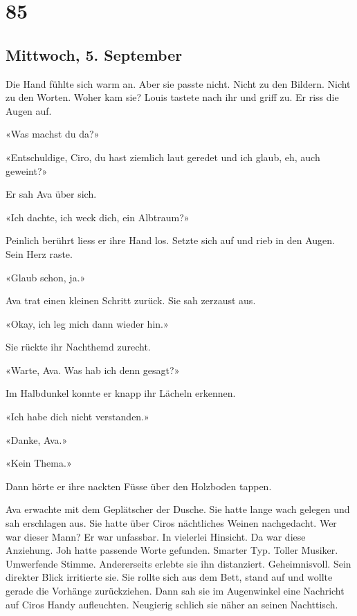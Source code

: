 \chapter{85}

\section{Mittwoch, 5. September}



Die Hand fühlte sich warm an. Aber sie passte nicht. Nicht zu den Bildern.
Nicht zu den Worten. Woher kam sie? Louis tastete nach ihr und griff zu. Er riss die Augen auf.

«Was machst du da?»

«Entschuldige, Ciro, du hast ziemlich laut geredet und ich glaub, eh,
auch geweint?»

Er sah Ava über sich.

«Ich dachte, ich weck dich, ein Albtraum?»

Peinlich berührt liess er ihre Hand los. Setzte sich auf und rieb in den
Augen. Sein Herz raste.

«Glaub schon, ja.»

Ava trat einen kleinen Schritt zurück. Sie sah zerzaust aus.

«Okay, ich leg mich dann wieder hin.»

Sie rückte ihr Nachthemd zurecht.

«Warte, Ava. Was hab ich denn gesagt?»

Im Halbdunkel konnte er knapp ihr Lächeln erkennen.

«Ich habe dich nicht verstanden.»

«Danke, Ava.»

«Kein Thema.»

Dann hörte er ihre nackten Füsse über den Holzboden tappen.

\sectionbreak

Ava erwachte mit dem Geplätscher der Dusche. Sie hatte lange wach
gelegen und sah erschlagen aus. Sie hatte über Ciros nächtliches Weinen
nachgedacht. Wer war dieser Mann? Er war unfassbar. In vielerlei
Hinsicht. Da war diese Anziehung. Joh hatte passende Worte gefunden.
Smarter Typ. Toller Musiker. Umwerfende Stimme. Andererseits erlebte sie
ihn distanziert. Geheimnisvoll. Sein direkter Blick irritierte sie.
Sie rollte sich aus dem Bett, stand auf und wollte gerade die Vorhänge
zurückziehen. Dann sah sie im Augenwinkel eine Nachricht auf Ciros
Handy aufleuchten. Neugierig schlich sie näher an seinen Nachttisch.


